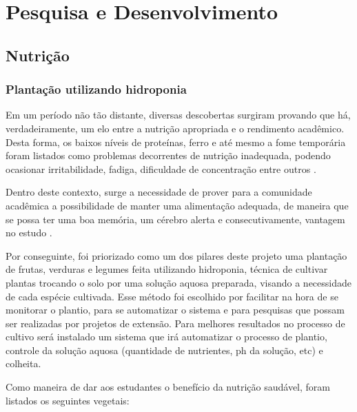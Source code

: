 \chapter{Pesquisa e Desenvolvimento}

\section{Nutrição}

\subsection{Plantação utilizando hidroponia}

  Em um período não tão distante, diversas descobertas surgiram provando que há, verdadeiramente, um elo entre a nutrição apropriada e o rendimento
  acadêmico. Desta forma, os baixos níveis de proteínas, ferro e até mesmo a fome temporária foram listados como problemas decorrentes
  de nutrição inadequada, podendo ocasionar irritabilidade, fadiga, dificuldade de concentração entre outros \cite{nutricao1}.

  Dentro deste contexto, surge a necessidade de prover para a comunidade acadêmica a possibilidade de manter uma alimentação adequada,
  de maneira que se possa ter uma boa memória, um cérebro alerta e consecutivamente, vantagem no estudo \cite{nutricao8}.

  Por conseguinte, foi priorizado como um dos pilares deste projeto uma plantação de frutas, verduras e legumes feita utilizando hidroponia,
  técnica de cultivar plantas trocando o solo por uma solução aquosa preparada, visando a necessidade de cada espécie cultivada.
  Esse método foi escolhido por facilitar na hora de se monitorar o plantio, para se automatizar o sistema e para pesquisas que possam ser
  realizadas por projetos de extensão. Para melhores resultados no processo de cultivo será instalado um sistema que irá automatizar o
  processo de plantio, controle da solução aquosa (quantidade de nutrientes, ph da solução, etc) e colheita.

  Como maneira de dar aos estudantes o benefício da nutrição saudável, foram listados os seguintes vegetais:

